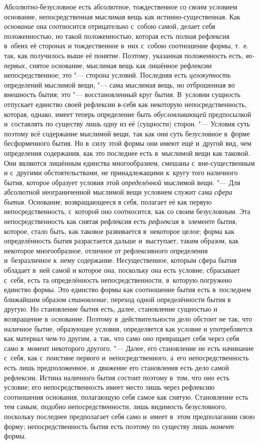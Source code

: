 Абсолютно-безусловное есть абсолютное,
тождественное со своим условием основание, непосредственная мыслимая вещь
как истинно-существенная. Как {\em основание} она
соотносится отрицательно с~собою самой, делает себя положенностью, но такой
положенностью, которая есть полная рефлексия в~обеих её сторонах и
тождественное в~них с~собою соотношение формы, т.~е. так, как получилось
выше её понятие. Поэтому, указанная положенность есть,
{\em во-первых,} снятое основание, мыслимая вещь как
лишённое рефлексии непосредственное; это "--- сторона условий. Последняя есть
{\em целокупность} определений мыслимой вещи, "--- сама
мыслимая вещь, но отброшенная во внешность бытия; это "--- восстановленный
круг бытия. В~условии сущность отпускает единство своей рефлексии в-себя
как некоторую непосредственность, которая, однако, имеет теперь определение
быть {\em обусловливающей} предпосылкой и~составлять по
существу лишь одну из её (сущности) сторон. "--- Условия суть поэтому всё
содержание мыслимой вещи, так как они суть безусловное в~форме
бесформенного бытия. Но в~силу этой формы они имеют ещё и~другой вид, чем
определения содержания, как это последнее есть в~мыслимой вещи как таковой.
Они являются лишённым единства многообразием, смешаны с~вне-существенным и
с~другими обстоятельствами, не принадлежащими к~кругу того наличного бытия,
которое образует условия этой {\em определённой}
мыслимой вещи. "--- Для абсолютной неограниченной мыслимой вещи условием служит
сама {\em сфера бытия}. Основание, возвращающееся в
себя, полагает её как первую непосредственность, с~которой оно соотносится,
как со своим безусловным. Эта непосредственность как снятая рефлексия есть
{\em рефлексия} в~элементе бытия, которое, стало быть,
как таковое развивается в~некоторое целое; форма как определённость бытия
разрастается дальше и~выступает, таким образом, как некоторое
многообразное, отличное от рефлексивного определения и~безразличное к~нему
содержание. Несущественное, которым сфера бытия обладает в~ней самой и
которое она, поскольку она есть условие, сбрасывает с~себя, есть та
определённость непосредственности, в~которую погружено единство формы. Это
единство формы как соотношение бытия есть в~последнем ближайшим образом
{\em становление,} переход одной определённости бытия в
другую. Но становление бытия есть, далее, становление сущностью и
возвращение в~основание. Поэтому в~действительности дело обстоит не так,
что наличное бытие, образующее условия, определяется как условие и
употребляется как материал чем-то другим, а~так, что само оно превращает
себя через себя само в~момент некоторого другого. "--- Далее, его становление
не есть начинание с~себя, как с~поистине первого и~непосредственного, а~его
непосредственность есть лишь предположенное, и~движение его становления
есть дело самой рефлексии. Истина наличного бытия состоит поэтому в~том,
что оно есть условие; его непосредственность имеет место лишь через
рефлексию соотношения основания, полагающую себя самое как снятую.
Становление есть тем самым, подобно непосредственности, лишь видимость
безусловного, поскольку последнее предполагает себя само и~имеет в~этом
предполагании свою форму; непосредственность бытия есть поэтому по существу
лишь {\em момент} формы.

